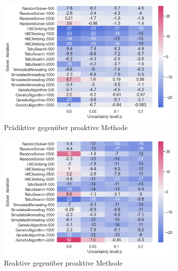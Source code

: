 \begin{figure}[H]

    \begin{subfigure}{0.497\linewidth}
        \centering
        \includegraphics[width=\linewidth]{assets/img/05_Evaluation/heatmap_m2_1.png}
        \caption{Prädiktive gegenüber proaktive Methode}
        \label{fig:evaluation_solver_m2_heatmap_1}
    \end{subfigure}
    \hfill
    \begin{subfigure}{0.497\linewidth}
        \centering
        \includegraphics[width=\linewidth]{assets/img/05_Evaluation/heatmap_m2_2.png}
        \caption{Reaktive gegenüber proaktive Methode}
        \label{fig:evaluation_solver_m2_heatmap_2}
    \end{subfigure}
    \par\bigskip 
    \begin{subfigure}{1\linewidth}

\end{subfigure}
\end{figure}
